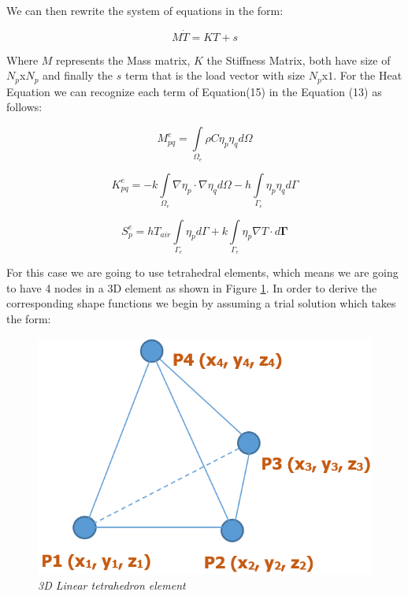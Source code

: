 \documentclass[12pt]{article}
\begin{document}
We can then rewrite the system of equations in the form:

\begin{equation}
 M\dot{T} = KT + s
\end{equation}

Where $M$ represents the Mass matrix, $K$ the Stiffness Matrix, both have size of $N_p$x$N_p$ and finally the $s$ term that is the load vector with size $N_p$x$1$. For the Heat Equation we can recognize each term of Equation(15) in the Equation (13) as follows:

\begin{equation}
 M_{pq}^e = \int\limits_{\Omega_e} \rho C \eta_p\eta_q  d\Omega
\end{equation}

\begin{equation}
 K_{pq}^e = - k \int\limits_{\Omega_e} \nabla \eta_p \cdot \nabla \eta_q d\Omega - h \int\limits_{\Gamma_e} \eta_p \eta_q d\Gamma
\end{equation}

\begin{equation}
 S_{p}^e = h T_{air} \int\limits_{\Gamma_e} \eta_p d\Gamma + k \int\limits_{\Gamma_{e}}{\eta_p\nabla T} \cdot d \mathbf{\Gamma}
\end{equation}

For this case we are going to use tetrahedral elements, which means we are going to have 4 nodes in a 3D element as shown in Figure \ref{fig:tetrahedron}. In order to derive the corresponding shape functions we begin by assuming a trial solution which takes the form:

\begin{figure}[h!]
    \includegraphics[scale=0.4]{tetrahedron.png}
    \centering
    \caption{\textit{3D Linear tetrahedron element}}
    \label{fig:tetrahedron}
\end{figure}
\end{document}
